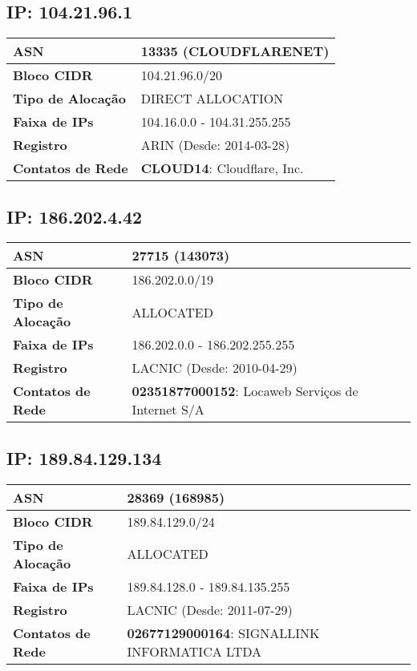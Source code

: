     \subsection{IP: 104.21.96.1}
    \begin{tabular}{|l|l|}
    \hline
    \textbf{ASN} & 13335 (CLOUDFLARENET) \\ \hline
    \textbf{Bloco CIDR} & 104.21.96.0/20 \\ \hline
    \textbf{Tipo de Alocação} & DIRECT ALLOCATION \\ \hline
    \textbf{Faixa de IPs} & 104.16.0.0 - 104.31.255.255 \\ \hline
    \textbf{Registro} & ARIN (Desde: 2014-03-28) \\ \hline
        
\textbf{Contatos de Rede} & \textbf{CLOUD14}: Cloudflare, Inc. 
\\ \hline
\end{tabular}


    \subsection{IP: 186.202.4.42}
    \begin{tabular}{|l|l|}
    \hline
    \textbf{ASN} & 27715 (143073) \\ \hline
    \textbf{Bloco CIDR} & 186.202.0.0/19 \\ \hline
    \textbf{Tipo de Alocação} & ALLOCATED \\ \hline
    \textbf{Faixa de IPs} & 186.202.0.0 - 186.202.255.255 \\ \hline
    \textbf{Registro} & LACNIC (Desde: 2010-04-29) \\ \hline
        
\textbf{Contatos de Rede} & \textbf{02351877000152}: Locaweb Serviços de Internet S/A 
\\ \hline
\end{tabular}


    \subsection{IP: 189.84.129.134}
    \begin{tabular}{|l|l|}
    \hline
    \textbf{ASN} & 28369 (168985) \\ \hline
    \textbf{Bloco CIDR} & 189.84.129.0/24 \\ \hline
    \textbf{Tipo de Alocação} & ALLOCATED \\ \hline
    \textbf{Faixa de IPs} & 189.84.128.0 - 189.84.135.255 \\ \hline
    \textbf{Registro} & LACNIC (Desde: 2011-07-29) \\ \hline
        
\textbf{Contatos de Rede} & \textbf{02677129000164}: SIGNALLINK INFORMATICA LTDA 
\\ \hline
\end{tabular}


